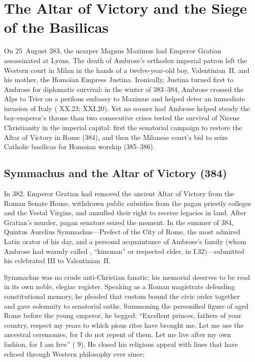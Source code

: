 \section{The Altar of Victory and the Siege of the Basilicas}

On 25~August 383, the usurper Magnus Maximus had Emperor Gratian assassinated at Lyons. The death of Ambrose's orthodox imperial patron left the Western court in Milan in the hands of a twelve-year-old boy, Valentinian~II, and his mother, the Homoian Empress Justina. Ironically, Justina turned first to Ambrose for diplomatic survival: in the winter of 383--384, Ambrose crossed the Alps to Trier on a perilous embassy to Maximus and helped deter an immediate invasion of Italy ( XX.23;  XXI.20). Yet no sooner had Ambrose helped steady the boy-emperor's throne than two consecutive crises tested the survival of Nicene Christianity in the imperial capital: first the senatorial campaign to restore the Altar of Victory in Rome (384), and then the Milanese court's bid to seize Catholic basilicas for Homoian worship (385--386).

\subsection{Symmachus and the Altar of Victory (384)}

In 382, Emperor Gratian had removed the ancient Altar of Victory from the Roman Senate House, withdrawn public subsidies from the pagan priestly colleges and the Vestal Virgins, and annulled their right to receive legacies in land. After Gratian's murder, pagan senators seized the moment. In the summer of 384, Quintus Aurelius Symmachus---Prefect of the City of Rome, the most admired Latin orator of his day, and a personal acquaintance of Ambrose's family (whom Ambrose had warmly called , ``kinsman'' or respected elder, in  I.32)---submitted his celebrated  III to Valentinian~II.

Symmachus was no crude anti-Christian fanatic; his memorial deserves to be read in its own noble, elegiac register. Speaking as a Roman magistrate defending constitutional memory, he pleaded that custom bound the civic order together and gave solemnity to senatorial oaths. Summoning the personified figure of aged Rome before the young emperor, he begged: ``Excellent princes, fathers of your country, respect my years to which pious rites have brought me. Let me use the ancestral ceremonies, for I do not repent of them. Let me live after my own fashion, for I am free'' ( 9). He closed his religious appeal with lines that have echoed through Western philosophy ever since:

